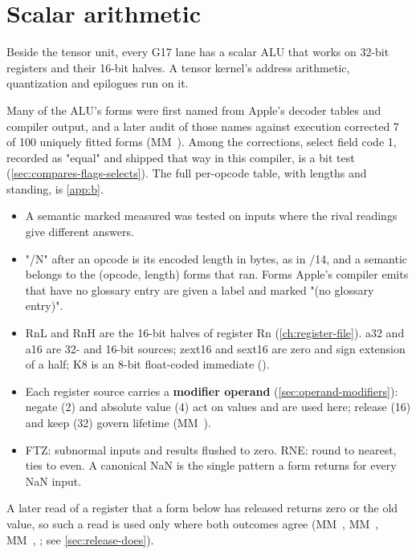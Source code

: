 \chapter{Scalar arithmetic}\label{ch:scalar-arithmetic}

Beside the tensor unit, every G17 lane has a scalar ALU that works on 32-bit registers and their 16-bit halves. A
tensor kernel's address arithmetic, quantization and epilogues run on it.

Many of the ALU's forms were first named from Apple's decoder tables and compiler output, and a later audit of those
names against execution corrected 7 of 100 uniquely fitted forms (MM~). Among the
corrections, select field code 1, recorded as "equal" and shipped that way in this compiler, is a bit test
(\cref{sec:compares-flags-selects}). The full per-opcode table, with lengths and standing, is \cref{app:b}.

\begin{itemize}
\item A semantic marked measured was tested on inputs where the rival readings give different answers.
\item "/N" after an opcode is its encoded length in bytes, as in /14, and a
  semantic belongs to the (opcode, length) forms that ran. Forms Apple's compiler emits that have no glossary entry are
  given a label and marked "(no glossary entry)".
\item RnL and RnH are the 16-bit halves of register Rn (\cref{ch:register-file}). a32 and a16 are 32- and
  16-bit sources; zext16 and sext16 are zero and sign extension of a half; K8 is an 8-bit float-coded immediate
  ().
\item Each register source carries a \textbf{modifier operand} (\cref{sec:operand-modifiers}): negate (2) and absolute value (4) act on values and
  are used here; release (16) and keep (32) govern lifetime (MM~).
\item FTZ: subnormal inputs and results flushed to zero. RNE: round to nearest, ties to even. A canonical NaN is the single
  pattern a form returns for every NaN input.
\end{itemize}

A later read of a register that a form below has released returns zero or the old value, so such a read is used only
where both outcomes agree (MM~, MM~, MM~, ;
see \cref{sec:release-does}).

